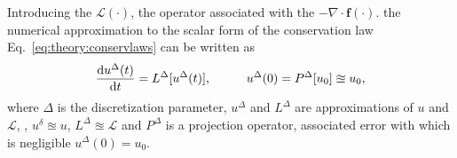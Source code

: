 %
%
% 
Introducing the $\mathcal{L}(\cdot)$, the operator associated with the $-\nabla\cdot\boldsymbol{f}(\cdot)$.
the numerical approximation to the scalar form of the conservation law Eq.~\eqref{eq:theory:conservlaws} can be written as 
%
\begin{equation}
\frac{\text{d}u^{\Delta}(t)}{\text{d}t} = L^{\Delta}[u^{\Delta}(t)], \hspace{10mm} u^{\Delta}(0) = P^{\Delta}[u_0] \approxeq u_0,
\label{eq:theory:conservlawsodepde}
\end{equation}
%
where $\Delta$ is the discretization parameter,
$u^{\Delta}$ and $L^{\Delta}$ are approximations of $u$ and $\mathcal{L}$, \ie, $u^{\delta}\approxeq u$, $L^{\Delta}\approxeq \mathcal{L}$ and $P^{\Delta}$ is a projection operator, associated error with which is negligible $u^{\Delta}(0) = u_0$. 

